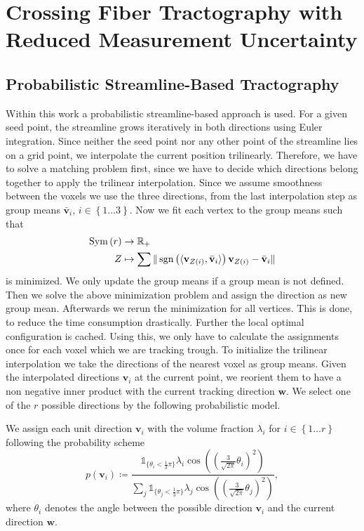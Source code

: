 \section{Crossing Fiber Tractography with Reduced Measurement Uncertainty}

\subsection{Probabilistic Streamline-Based Tractography}

Within this work a probabilistic streamline-based approach is used. For a given
seed point, the streamline grows iteratively in both directions using Euler
integration. Since neither the seed point nor any other point of the streamline
lies on a grid point, we interpolate the current position trilinearly. Therefore,
we have to solve a matching problem first, since we have to decide which
directions belong together to apply the trilinear interpolation. Since we assume
smoothness between the voxels we use the three directions, from the last
interpolation step as group means $\bar{\mathbf{v}}_i$, $i \in \left\{ 1\dots 3 
\right\}$. Now we fit each vertex to the group means such
that 
\begin{align}
	\text{Sym} \left( r  \right) & \rightarrow \mathbb{R}_+ \\ 
	Z & \mapsto \sum \| \operatorname*{sgn} \left( \langle \mathbf{v}_{Z \left( i \right)}
	, \bar{\mathbf{v}}_i \rangle  \right) \mathbf{v}_{Z \left( i \right)} -
\bar{\mathbf{v}}_i
	\|
\end{align}
is minimized. We only update the group means if a group mean is not defined.
Then we solve the above minimization problem and assign the direction as new
group mean. Afterwards we rerun the minimization for all vertices. This is done,
to reduce the time consumption drastically. Further the local optimal
configuration is cached. Using this, we only have to calculate the assignments
once for each voxel which we are tracking trough. 
To initialize the trilinear interpolation we take the directions of the nearest voxel as group means.
Given the interpolated directions $\mathbf{v}_i$ at the current point, we
reorient them to have a non negative inner product with the current tracking
direction $\mathbf{w}$. We select one of the $r$ possible directions by the
following probabilistic model.

We assign each unit direction $\mathbf{v}_i$ with the volume fraction
$\lambda_i$ for $i \in \left\{ 1\dots r \right\}$ following the probability
scheme 
\[
	p \left( \mathbf{v}_i \right) \coloneqq \frac{ \mathbb{1}_{\lbrace\theta_i <
		\frac{1}{3} \pi \rbrace} \lambda_i \cos \left( \left( \frac{3}{\sqrt{2
\pi}} \theta_i \right)^2 \right)}{\sum_j \mathbb{1}_{\lbrace\theta_j <
		\frac{1}{3} \pi \rbrace} \lambda_j \cos \left( \left( \frac{3}{\sqrt{2
\pi}} \theta_j \right)^2 \right) }, 
\]
where $\theta_i$ denotes the angle between the possible direction $\mathbf{v}_i$
and the current direction $\mathbf{w}$. 

